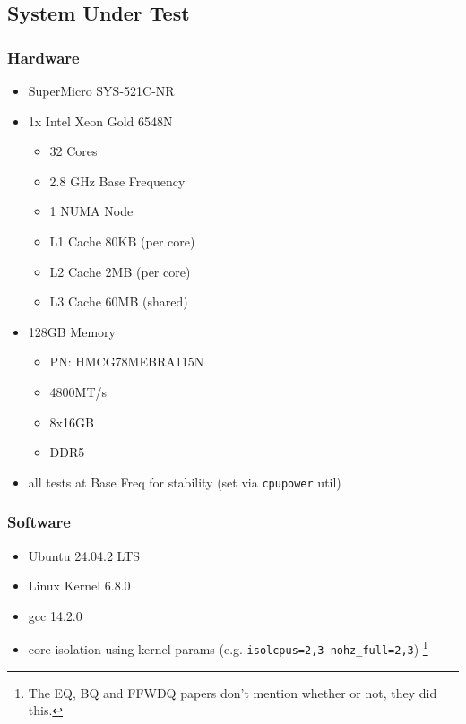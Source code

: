 \subsection{System Under Test}
\subsubsection{Hardware}
\begin{itemize}
    \item SuperMicro SYS-521C-NR
    \item 1x Intel Xeon Gold 6548N
        \begin{itemize}
            \item 32 Cores
            \item 2.8 GHz Base Frequency
            \item 1 NUMA Node
            \item L1 Cache 80KB (per core)
            \item L2 Cache 2MB (per core)
            \item L3 Cache 60MB (shared)
        \end{itemize}
    \item 128GB Memory
        \begin{itemize}
            \item PN: HMCG78MEBRA115N
            \item 4800MT/s
            \item 8x16GB
            \item DDR5
        \end{itemize}
    \item all tests at Base Freq for stability (set via \texttt{cpupower} util)
\end{itemize}

\subsubsection{Software}
\begin{itemize}
    \item Ubuntu 24.04.2 LTS
    \item Linux Kernel 6.8.0
    \item gcc 14.2.0
    \item core isolation using kernel params (e.g. \texttt{isolcpus=2,3 nohz\_full=2,3})
        \footnote{The EQ, BQ and FFWDQ papers don't mention whether or not, they did this.}
\end{itemize}
